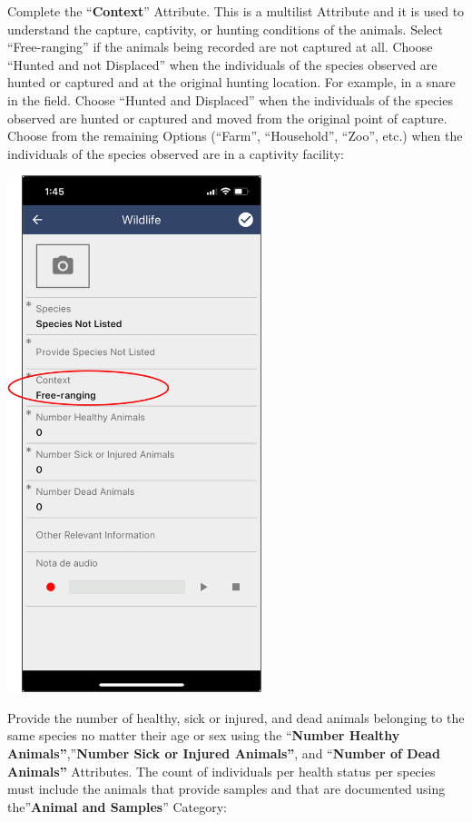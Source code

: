 \documentclass[
  letterpaper,
  DIV=11,
  numbers=noendperiod]{scrreprt}
\begin{document}
Complete the ``\textbf{Context}'' Attribute. This is a multilist
Attribute and it is used to understand the capture, captivity, or
hunting conditions of the animals. Select ``Free-ranging'' if the
animals being recorded are not captured at all. Choose ``Hunted and not
Displaced'' when the individuals of the species observed are hunted or
captured and at the original hunting location. For example, in a snare
in the field. Choose ``Hunted and Displaced'' when the individuals of
the species observed are hunted or captured and moved from the original
point of capture. Choose from the remaining Options (``Farm'',
``Household'', ``Zoo'', etc.) when the individuals of the species
observed are in a captivity facility:

\includegraphics[width=2.91667in,height=\textheight]{Pictures_for_manual/Picture9.png}

Provide the number of healthy, sick or injured, and dead animals
belonging to the same species no matter their age or sex using the
``\textbf{Number Healthy Animals''},''\textbf{Number Sick or Injured
Animals''}, and ``\textbf{Number of Dead Animals''} Attributes. The
count of individuals per health status per species must include the
animals that provide samples and that are documented using
the''\textbf{Animal and Samples}'' Category:
\end{document}
